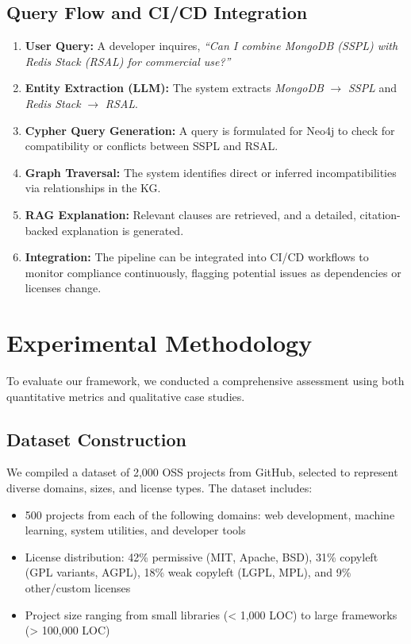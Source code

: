\documentclass[9pt,twocolumn]{article}
\begin{document}
\subsection{Query Flow and CI/CD Integration}
\begin{enumerate}
    \item \textbf{User Query:} A developer inquires, \emph{``Can I combine MongoDB (SSPL) with Redis Stack (RSAL) for commercial use?''}
    \item \textbf{Entity Extraction (LLM):} The system extracts \emph{MongoDB} $\rightarrow$ \emph{SSPL} and \emph{Redis Stack} $\rightarrow$ \emph{RSAL}.
    \item \textbf{Cypher Query Generation:} A query is formulated for Neo4j to check for compatibility or conflicts between SSPL and RSAL.
    \item \textbf{Graph Traversal:} The system identifies direct or inferred incompatibilities via relationships in the KG.
    \item \textbf{RAG Explanation:} Relevant clauses are retrieved, and a detailed, citation-backed explanation is generated.
    \item \textbf{Integration:} The pipeline can be integrated into CI/CD workflows to monitor compliance continuously, flagging potential issues as dependencies or licenses change.
\end{enumerate}

\section{Experimental Methodology}
\label{sec:methodology}

To evaluate our framework, we conducted a comprehensive assessment using both quantitative metrics and qualitative case studies.

\subsection{Dataset Construction}
We compiled a dataset of 2,000 OSS projects from GitHub, selected to represent diverse domains, sizes, and license types. The dataset includes:

\begin{itemize}
    \item 500 projects from each of the following domains: web development, machine learning, system utilities, and developer tools
    \item License distribution: 42\% permissive (MIT, Apache, BSD), 31\% copyleft (GPL variants, AGPL), 18\% weak copyleft (LGPL, MPL), and 9\% other/custom licenses
    \item Project size ranging from small libraries (< 1,000 LOC) to large frameworks (> 100,000 LOC)
\end{itemize}
\end{document}
